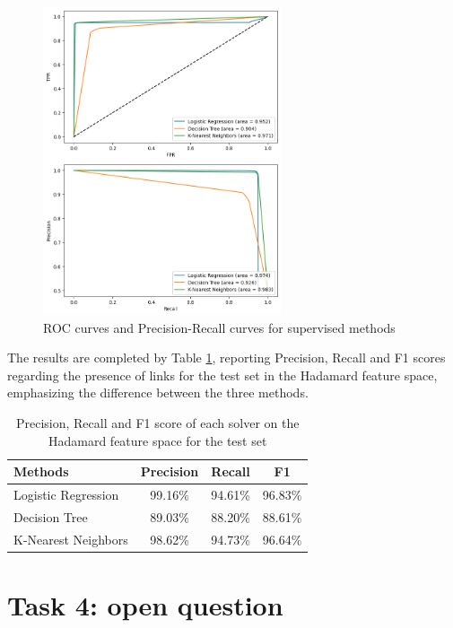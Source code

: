 \documentclass[sigchi]{acmart}
\begin{document}
\begin{figure}[H]
\centering
\includegraphics[width=7cm]{img/roc_superv_3_1.png}
\caption{ROC curves and Precision-Recall curves for supervised methods}
\label{fig:roc_sup}
\end{figure}

The results are completed by Table \ref{table:prec_rec}, reporting Precision, Recall and F1 scores regarding the presence of links for the test set in the Hadamard feature space, emphasizing the difference between the three methods.

\renewcommand{\arraystretch}{1.3}
\begin{table}[H]
\begin{center}
\scriptsize
\begin{tabular}{ |l|c|c|c| } 
 \hline
 \textbf{Methods} & \textbf{Precision} & \textbf{Recall} & \textbf{F1} \\
 \hline
Logistic Regression & 99.16\% & 94.61\% & 96.83\% \\
Decision Tree & 89.03\% & 88.20\% & 88.61\%\\
K-Nearest Neighbors & 98.62\% & 94.73\% & 96.64\% \\

 \hline
\end{tabular}
\end{center}
\caption{\label{table:prec_rec}Precision, Recall and F1 score of each solver on the Hadamard feature space for the test set}
\end{table}

\section{Task 4: open question}
\end{document}
